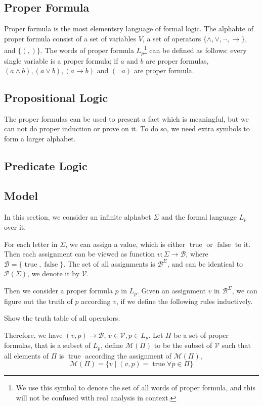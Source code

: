 \documentclass{article}
\def\true{\mathop{\mathrm{true}}}
\def\false{\mathop{\mathrm{false}}}
\begin{document}
\subsection{Proper Formula}
Proper formula is the most elementsry language of formal logic.
The alphabte of proper formula consist of a set of variables $V$,
a set of operators $\{\land, \lor , \lnot , \rightarrow\}$, and $\{(, )\}$.
The words of proper formula $L_p$\footnote{We use this symbol to denote the
set of all words of proper formula, and this will not be confused with real
analysis in context.}
can be defined as follows: every single variable is a proper formula;
if $a$ and $b$ are proper formulas, $(a \land b), (a \lor b), (a \rightarrow b)$
and $(\lnot a)$ are proper formula.

\subsection{Propositional Logic}
The proper formulas can be used to present a fact which is meaningful,
but we can not do proper induction or prove on it.
To do so, we need extra symbols to form a larger alphabet.

\subsection{Predicate Logic}

\subsection{Model}
In this section, we consider an infinite alphabet $\Sigma$
and the formal language $L_p$ over it.

For each letter in $\Sigma$, we can assign a value, which is
either $\true$ or $\false$ to it. Then each assignment can be
viewed as function $v : \Sigma \to \mathcal{B}$,
where $\mathcal{B} = \{\true, \false\}$. The set of all assignments 
is $\mathcal{B}^\Sigma$, and can be identical to $\mathcal{P}(\Sigma)$,
we denote it by $\mathcal{V}$.

Then we consider a proper formula $p$ in $L_p$. Given an assignment
$v$ in $\mathcal{B}^\Sigma$, we can figure out the truth of $p$ according $v$,
if we define the following rules inductively.

Show the truth table of all operators.

Therefore, we have $(v, p) \to \mathcal{B}$, $v \in \mathcal{V}, p \in L_p$.
Let $\Pi$ be a set of proper formulas, that is a subset of $L_p$,
define $\mathcal{M}(\Pi)$ to be the subset of $\mathcal{V}$ such that all
elements of $\Pi$ is $\true$ according the assignment of $\mathcal{M}(\Pi)$,
$$\mathcal{M}(\Pi) = \{v \mid (v, p) = \true \forall p \in \Pi\}$$
\end{document}
